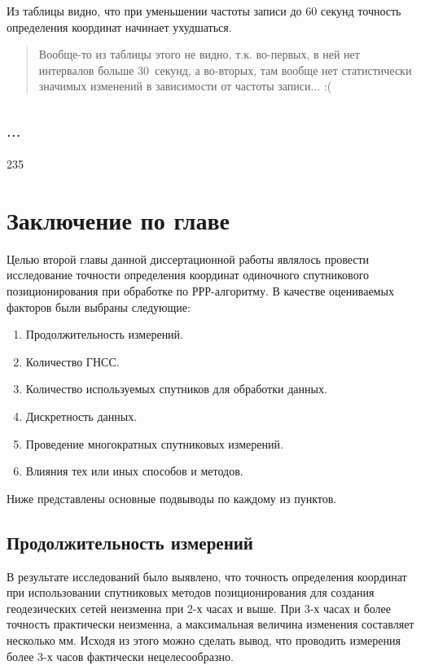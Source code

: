 Из таблицы видно, что при уменьшении частоты записи до 60 секунд точность определения координат начинает ухудшаться.

\begin{quote}
	Вообще-то из таблицы этого не видно, т.к. во-первых, в ней нет интервалов больше $30$~секунд, а во-вторых, там вообще нет статистически значимых изменений в зависимости от частоты записи... :(
\end{quote}


\subsection{$\ldots$}\label{subsec:ch2/sec3/sub5}

235


\section{Заключение по главе}\label{sec:ch2/sect4}

Целью второй главы данной диссертационной работы являлось провести исследование точности определения координат одиночного спутникового позиционирования при обработке по РРР-алгоритму. В качестве оцениваемых факторов были выбраны следующие:
\begin{enumerate}
	\item Продолжительность измерений.
	\item Количество ГНСС.
	\item Количество используемых спутников для обработки данных.
	\item Дискретность данных.
	\item Проведение многократных спутниковых измерений.
	\item Влияния тех или иных способов и методов.
\end{enumerate}
Ниже представлены основные подвыводы по каждому из пунктов.

\subsection*{Продолжительность измерений}\label{subsec:ch2/sec4/sub-1}

В результате исследований было выявлено, что точность определения координат при использовании спутниковых методов позиционирования для создания геодезических сетей неизменна при 2-х часах и выше. При 3-х часах и более точность практически неизменна, а максимальная величина изменения составляет несколько мм. Исходя из этого можно сделать вывод, что проводить измерения более 3-х часов фактически нецелесообразно.

